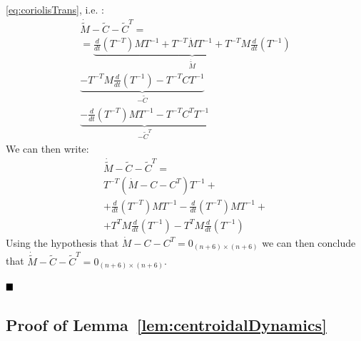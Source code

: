 \begin{enumerate}
\eqref{eq:coriolisTrans}, i.e. :
\begin{eqnarray*}
\dot{\tilde{M}} - \tilde{C} - \tilde{C}^{T} = \\
=
\underbrace{
\frac{d}{dt} \left( {T}^{-T} \right) M T^{-1}  +
T^{-T} \dot{M} T^{-1} + 
T^{-T} M  \frac{d}{dt} \left( T^{-1} \right)}_{\dot{\tilde{M}}} \\  
 \underbrace{- T^{-T} M \frac{d}{dt} \left( T^{-1} \right)  - T^{-T} C  T^{-1}}_{ -\tilde{C} } \\  
 \underbrace{- \frac{d}{dt} \left( T^{-T}\right)  M  T^{-1} -  T^{-T} {C}^T  T^{-1} }_{ -\tilde{C}^T }
 \end{eqnarray*}
We can then write:
\begin{eqnarray*}
\dot{\tilde{M}} - \tilde{C} - \tilde{C}^{T} = \\
 T^{-T} \left( \dot{M} - C - C^{T} \right) T^{-1} + \\
 + \frac{d}{dt} \left( {T}^{-T} \right) M T^{-1}  - \frac{d}{dt} \left( {T}^{-T} \right) M T^{-1}  + \\ + T^T M  \frac{d}{dt} \left( T^{-1} \right) - T^T M  \frac{d}{dt} \left( T^{-1} \right)
\end{eqnarray*}
 Using the hypothesis that $\dot{M} - C - C^{T} = 0_{(n+6) \times (n+6)}$ we can then conclude that $\dot{\tilde{M}} - \tilde{C} - \tilde{C}^{T} = 0_{(n+6) \times (n+6)}$.

\end{enumerate}
$\hfill\blacksquare$

\subsection{Proof of Lemma~\ref{lem:centroidalDynamics}}
\label{proof:centroidalDynamics}

